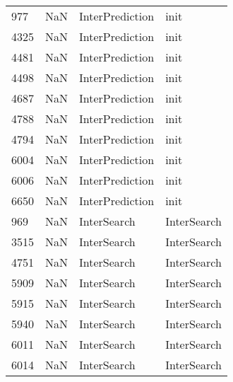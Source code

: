 \begin{tabular}{llll}
977  &                   NaN &            InterPrediction &                                      init \\
4325 &                   NaN &            InterPrediction &                                      init \\
4481 &                   NaN &            InterPrediction &                                      init \\
4498 &                   NaN &            InterPrediction &                                      init \\
4687 &                   NaN &            InterPrediction &                                      init \\
4788 &                   NaN &            InterPrediction &                                      init \\
4794 &                   NaN &            InterPrediction &                                      init \\
6004 &                   NaN &            InterPrediction &                                      init \\
6006 &                   NaN &            InterPrediction &                                      init \\
6650 &                   NaN &            InterPrediction &                                      init \\
969  &                   NaN &                InterSearch &                               InterSearch \\
3515 &                   NaN &                InterSearch &                               InterSearch \\
4751 &                   NaN &                InterSearch &                               InterSearch \\
5909 &                   NaN &                InterSearch &                               InterSearch \\
5915 &                   NaN &                InterSearch &                               InterSearch \\
5940 &                   NaN &                InterSearch &                               InterSearch \\
6011 &                   NaN &                InterSearch &                               InterSearch \\
6014 &                   NaN &                InterSearch &                               InterSearch \\

\end{tabular}
